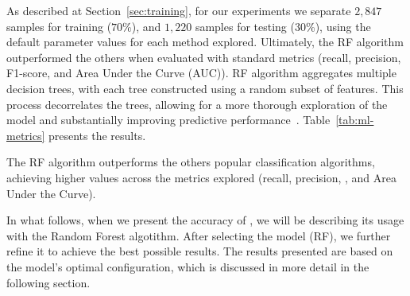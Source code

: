 

As described at Section~\ref{sec:training}, for our experiments we separate $2,847$ samples for training ($70$\%), and $1,220$ samples for testing ($30$\%), using the default parameter values for each method explored. Ultimately, the RF algorithm outperformed the others when evaluated with standard metrics (recall, precision, F1-score, and Area Under the Curve (AUC)). RF algorithm aggregates multiple decision trees,
with each tree constructed using a random subset of features. This process decorrelates the trees, allowing for a more thorough
exploration of the model and substantially improving predictive performance~\cite{james2023introduction}.
Table~\ref{tab:ml-metrics} presents the results. 

\begin{table}[htb]
    \caption{Performance of the ML algorithms to classify the app as malware or non-malware using network flow data from the \fds.}
 \label{tab:ml-metrics}
\end{table}

\begin{finding}
  The RF algorithm outperforms the others popular classification algorithms, achieving higher values across the metrics explored (recall, precision, \fone, and Area Under the Curve).
\end{finding}

In what follows, when we present the accuracy of \droidxpflow, we
will be describing its usage with the Random Forest algotithm. After selecting the model (RF), we further refine it to achieve the best possible results. The results presented are based on the model's optimal configuration, which is discussed in more detail in the following section.


